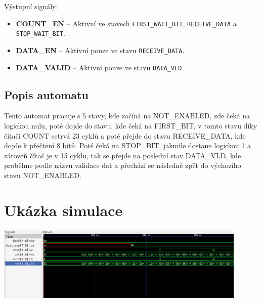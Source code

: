 \documentclass[10pt,a4paper]{article}
\begin{document}
Výstupní signály:

\begin{itemize}
    \item \textbf{COUNT\_EN} -- Aktivní ve stavech \texttt{FIRST\_WAIT\_BIT}, \texttt{RECEIVE\_DATA} a \texttt{STOP\_WAIT\_BIT}.
    \item \textbf{DATA\_EN} -- Aktivní pouze ve stavu \texttt{RECEIVE\_DATA}.
    \item \textbf{DATA\_VALID} -- Aktivní pouze ve stavu \texttt{DATA\_VLD}.
\end{itemize}

\subsection{Popis automatu}
Tento automat pracuje s 5 stavy, kde začíná na NOT\_ENABLED, zde čeká na logickou nulu, poté
dojde do stavu, kde čeká na FIRST\_BIT, v tomto stavu díky čítači COUNT setrvá 23 cyklů a poté přejde
do stavu RECEIVE\_DATA, kde dojde k přečtení 8 bitů. Poté čeká na STOP\_BIT, jakmile dostane logickou 1 a zároveň
čítač je v 15 cyklu, tak se přejde na poslední stav DATA\_VLD, kde proběhne podle názvu validace dat a
přechází se následně zpět do výchozího stavu NOT\_ENABLED.

\section{Ukázka simulace}
\begin{center}
    \includegraphics[width=0.9\textwidth]{gtkwave.png}
\end{center}
\end{document}
